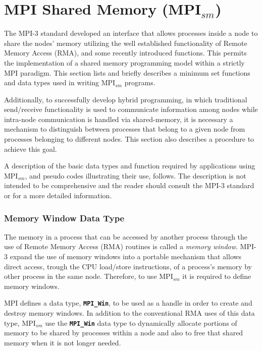 \section{MPI Shared Memory (MPI$_{sm}$)}

The MPI-3 standard developed an interface that allows processes inside a node to share the nodes' memory utilizing the well established functionality of Remote Memory Access (RMA), and some recently introduced functions. This permits the implementation of a shared memory programming model within a strictly MPI paradigm. This section lists and briefly describes a minimum set functions and data types used in writing MPI$_{sm}$ programs. 
\medskip

Additionally, to successfully develop hybrid programming, in which traditional send/receive functionality is used to communicate information among nodes while intra-node communication is handled via shared-memory, it is necessary a mechanism to distinguish between processes that belong to a given node from processes belonging to different nodes. This section also describes a procedure to achieve this goal. 


\medskip

A description of the basic data types and function required by applications using MPI$_{sm}$, and pseudo codes illustrating their use, follows. The description is not intended to be comprehensive and the reader should consult the MPI-3 standard\cite{MPI-3}  or \cite{UsingAdvancedMPI} for a more detailed information.


\medskip

\subsubsection*{Memory Window Data Type}

The memory in a process that can be accessed by another process through the use of Remote Memory Access (RMA) routines is called a \emph{memory window}. MPI-3 expand the use of memory windows into a portable mechanism that allows direct access, trough the CPU load/store instructions, of a process's memory by other process in the same node. Therefore, to use MPI$_{sm}$ it is required to define memory windows.

\medskip

MPI defines a data type, \textbf{\texttt{MPI\_Win}}, to be used as a handle in order to create and destroy memory windows. In addition to the conventional RMA uses of this data type, MPI$_{sm}$ use the \textbf{\texttt{MPI\_Win}} data type to dynamically allocate portions of memory to be shared by processes within a node and also to free that shared memory when it is not longer needed.


